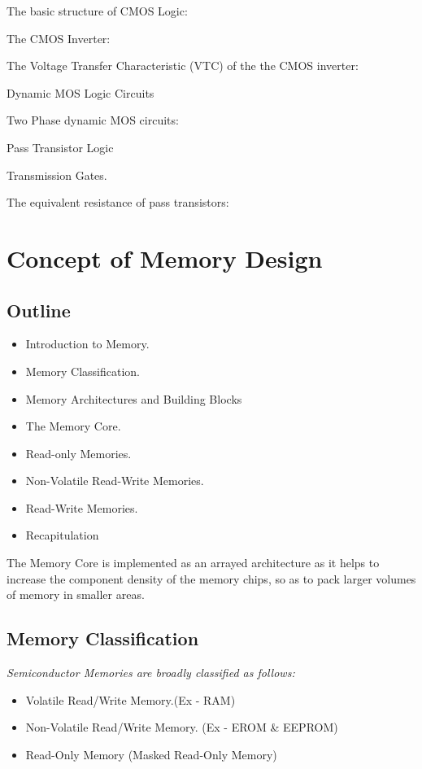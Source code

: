 \documentclass[12pt, letterpaper]{article}
\begin{document}
The basic structure of CMOS Logic:



The CMOS Inverter:

The Voltage Transfer Characteristic (VTC) of the the CMOS inverter:





						  Dynamic MOS Logic Circuits

Two Phase dynamic MOS circuits:


 






							







							Pass Transistor Logic


Transmission Gates.


The equivalent resistance of pass transistors:





\section{Concept of Memory Design}

\subsection{Outline}
\begin{itemize}
    \item Introduction to Memory.
    \item Memory Classification.
    \item Memory Architectures and Building Blocks
    \item The Memory Core.
    \item	Read-only Memories.
    \item	Non-Volatile Read-Write Memories.
    \item Read-Write Memories.
    \item Recapitulation
\end{itemize}

The Memory Core is implemented as an arrayed architecture as it helps to increase the component density of the memory chips, so as to pack larger volumes of memory in smaller areas. 
\subsection{Memory Classification}
\emph{Semiconductor Memories are broadly classified as follows:}
\begin{itemize}
    \item  Volatile Read/Write Memory.(Ex - RAM)
    \item Non-Volatile Read/Write Memory. (Ex - EROM \& EEPROM)
    \item Read-Only Memory (Masked Read-Only Memory)
\end{itemize}
\end{document}
